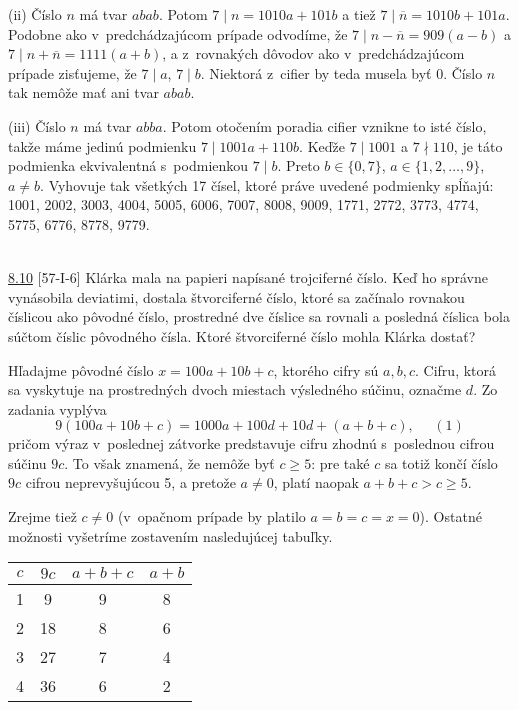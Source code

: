 (ii) Číslo $n$ má tvar $abab$. Potom $7 \mid n = 1010a + 101b$ a tiež $7 \mid \overline{n} = 1010b + 101a$. Podobne ako v~predchádzajúcom prípade odvodíme, že $7 \mid n - \overline{n} = 909(a - b)$ a $7 \mid n + \overline{n} = 1111(a + b)$, a z~rovnakých dôvodov ako v~predchádzajúcom prípade zisťujeme, že $7 \mid a$, $7 \mid b$. Niektorá z~cifier by teda musela byť 0. Číslo $n$ tak nemôže mať ani tvar $abab$.

(iii) Číslo $n$ má tvar $abba$. Potom otočením poradia cifier vznikne to isté číslo, takže máme jedinú podmienku $7 \mid 1001a + 110b$. Keďže $7 \mid 1001$ a $7 \nmid 110$, je táto podmienka ekvivalentná s~podmienkou $7 \mid b$. Preto $b \in \{0, 7\}$, $a \in \{1, 2, \ldots, 9\}$, $a \neq b$. Vyhovuje tak všetkých 17 čísel, ktoré práve uvedené podmienky spĺňajú: 1001, 2002, 3003, 4004, 5005, 6006, 7007, 8008, 9009, 1771, 2772, 3773, 4774, 5775, 6776, 8778, 9779.\\
\\
\begin{tcolorbox}[breakable,notitle,boxrule=0pt,colback=light-gray,colframe=light-gray]\ul{8.10} [57-I-6] Klárka mala na papieri napísané trojciferné číslo. Keď ho správne vynásobila deviatimi, dostala štvorciferné číslo, ktoré sa začínalo rovnakou číslicou ako pôvodné číslo, prostredné dve číslice sa rovnali a posledná číslica bola súčtom číslic pôvodného čísla. Ktoré štvorciferné číslo mohla Klárka dostať?

\end{tcolorbox}

\rieh Hľadajme pôvodné číslo $x = 100a + 10b + c$, ktorého cifry sú $a, b, c$. Cifru, ktorá sa vyskytuje na prostredných dvoch miestach výsledného súčinu, označme $d$. Zo zadania vyplýva
$$ 9(100a + 10b + c) = 1 000a + 100d + 10d + (a + b + c), \ \ \ \ \ \ (1)$$
pričom výraz v~poslednej zátvorke predstavuje cifru zhodnú s~poslednou cifrou súčinu $9c$. To však znamená, že nemôže byť $c \geq 5$: pre také $c$ sa totiž končí číslo $9c$ cifrou neprevyšujúcou 5, a pretože $a\neq 0$, platí naopak $a + b + c > c \geq 5$.

Zrejme tiež $c \neq 0$ (v~opačnom prípade by platilo $a = b = c = x = 0$). Ostatné
možnosti vyšetríme zostavením nasledujúcej tabuľky.
\begin{center}
\begin{tabular}{|c|c|c|c|}
\hline
$c$ &$9c$ & $a+b+c$ & $a+b$ \\
\hline
\hline
1 & 9 & 9 & 8 \\
\hline
2 & 18 & 8 & 6\\
\hline
3& 27 & 7& 4\\
\hline
4& 36 & 6 & 2\\
\hline
\end{tabular}
\end{center}

